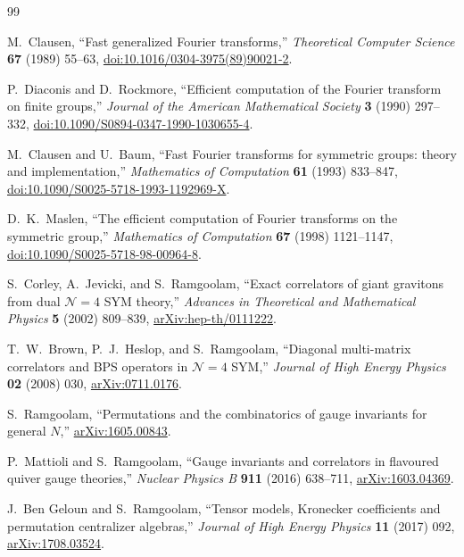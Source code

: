 \documentclass[11pt,a4paper]{article}
\begin{document}
\begin{thebibliography}{99}

M.~Clausen,
``Fast generalized Fourier transforms,''
\emph{Theoretical Computer Science} \textbf{67} (1989) 55--63,
\href{https://doi.org/10.1016/0304-3975(89)90021-2}{doi:10.1016/0304-3975(89)90021-2}.

P.~Diaconis and D.~Rockmore,
``Efficient computation of the Fourier transform on finite groups,''
\emph{Journal of the American Mathematical Society} \textbf{3} (1990)
297--332,
\href{https://doi.org/10.1090/S0894-0347-1990-1030655-4}{doi:10.1090/S0894-0347-1990-1030655-4}.

M.~Clausen and U.~Baum,
``Fast Fourier transforms for symmetric groups: theory and implementation,''
\emph{Mathematics of Computation} \textbf{61} (1993) 833--847,
\href{https://doi.org/10.1090/S0025-5718-1993-1192969-X}{doi:10.1090/S0025-5718-1993-1192969-X}.

D.~K.~Maslen,
``The efficient computation of Fourier transforms on the symmetric group,''
\emph{Mathematics of Computation} \textbf{67} (1998) 1121--1147,
\href{https://doi.org/10.1090/S0025-5718-98-00964-8}{doi:10.1090/S0025-5718-98-00964-8}.

S.~Corley, A.~Jevicki, and S.~Ramgoolam,
``Exact correlators of giant gravitons from dual $\mathcal N=4$ SYM theory,''
\emph{Advances in Theoretical and Mathematical Physics} \textbf{5} (2002)
809--839,
\href{https://arxiv.org/abs/hep-th/0111222}{arXiv:hep-th/0111222}.

T.~W.~Brown, P.~J.~Heslop, and S.~Ramgoolam,
``Diagonal multi-matrix correlators and BPS operators in $\mathcal N=4$ SYM,''
\emph{Journal of High Energy Physics} \textbf{02} (2008) 030,
\href{https://arxiv.org/abs/0711.0176}{arXiv:0711.0176}.

S.~Ramgoolam,
``Permutations and the combinatorics of gauge invariants for general $N$,''
\href{https://arxiv.org/abs/1605.00843}{arXiv:1605.00843}.

P.~Mattioli and S.~Ramgoolam,
``Gauge invariants and correlators in flavoured quiver gauge theories,''
\emph{Nuclear Physics B} \textbf{911} (2016) 638--711,
\href{https://arxiv.org/abs/1603.04369}{arXiv:1603.04369}.

J.~Ben Geloun and S.~Ramgoolam,
``Tensor models, Kronecker coefficients and permutation centralizer algebras,''
\emph{Journal of High Energy Physics} \textbf{11} (2017) 092,
\href{https://arxiv.org/abs/1708.03524}{arXiv:1708.03524}.


\end{thebibliography}
\end{document}
